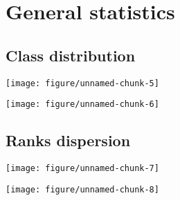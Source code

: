 \documentclass[a4paper]{article}\usepackage[]{graphicx}\usepackage[]{color}
\makeatletter
\def\maxwidth{ %
  \ifdim\Gin@nat@width>\linewidth
    \linewidth
  \else
    \Gin@nat@width
  \fi
}
\newenvironment{knitrout}{}{} %
\makeatother
\begin{document}
\section{General statistics}

\subsection{Class distribution}

\begin{minipage}[b]{0.45\linewidth}
\centering

\begin{knitrout}
\color{fgcolor}

{\centering \texttt{[image: figure/unnamed-chunk-5]} 

}



\end{knitrout}


\end{minipage}
\hspace{0.5cm}
\begin{minipage}[b]{0.45\linewidth}
\centering

\begin{knitrout}
\color{fgcolor}

{\centering \texttt{[image: figure/unnamed-chunk-6]} 

}



\end{knitrout}


\end{minipage}


\subsection{Ranks dispersion}

\begin{minipage}[b]{0.45\linewidth}
\centering
\begin{knitrout}
\color{fgcolor}
\texttt{[image: figure/unnamed-chunk-7]} 

\end{knitrout}

\end{minipage}
\hspace{0.5cm}
\begin{minipage}[b]{0.45\linewidth}
\centering
\begin{knitrout}
\color{fgcolor}
\texttt{[image: figure/unnamed-chunk-8]} 

\end{knitrout}

\end{minipage}
\end{document}
